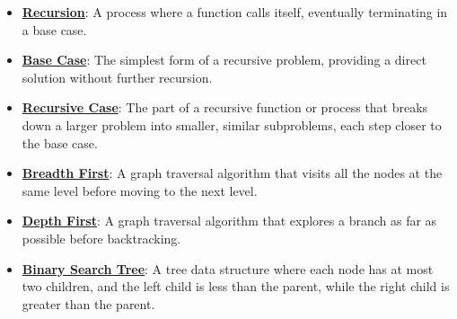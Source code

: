 \documentclass{article}%
\begin{document}
\begin{itemize}[leftmargin=*]%
\item \href{https://purdue.brightspace.com/d2l/common/assets/pdfjs-d2l-dist/1.0.14-legacy/web/viewer.html?file=%2Fcontent%2Fenforced%2F1095467-wl.202510.CS.24300.001%2F14L1-DepthFS.pdf%3Fou%3D1095467&lang=en-us&container=d2l-fileviewer-rendered-pdf&fullscreen=d2l-fileviewer-rendered-pdf-dialog&height=667#page=2}{\textbf{Recursion}}: A process where a function calls itself, eventually terminating in a base case.%
\item \href{https://purdue.brightspace.com/d2l/common/assets/pdfjs-d2l-dist/1.0.14-legacy/web/viewer.html?file=%2Fcontent%2Fenforced%2F1095467-wl.202510.CS.24300.001%2F14L1-DepthFS.pdf%3Fou%3D1095467&lang=en-us&container=d2l-fileviewer-rendered-pdf&fullscreen=d2l-fileviewer-rendered-pdf-dialog&height=667#page=5}{\textbf{Base Case}}: The simplest form of a recursive problem, providing a direct solution without further recursion.%
\item \href{https://purdue.brightspace.com/d2l/common/assets/pdfjs-d2l-dist/1.0.14-legacy/web/viewer.html?file=%2Fcontent%2Fenforced%2F1095467-wl.202510.CS.24300.001%2F14L1-DepthFS.pdf%3Fou%3D1095467&lang=en-us&container=d2l-fileviewer-rendered-pdf&fullscreen=d2l-fileviewer-rendered-pdf-dialog&height=667#page=5}{\textbf{Recursive Case}}: The part of a recursive function or process that breaks down a larger problem into smaller, similar subproblems, each step closer to the base case.%
\item \href{https://purdue.brightspace.com/d2l/common/assets/pdfjs-d2l-dist/1.0.14-legacy/web/viewer.html?file=%2Fcontent%2Fenforced%2F1095467-wl.202510.CS.24300.001%2F14L1-DepthFS.pdf%3Fou%3D1095467&lang=en-us&container=d2l-fileviewer-rendered-pdf&fullscreen=d2l-fileviewer-rendered-pdf-dialog&height=667#page=8}{\textbf{Breadth First}}: A graph traversal algorithm that visits all the nodes at the same level before moving to the next level.%
\item \href{https://purdue.brightspace.com/d2l/common/assets/pdfjs-d2l-dist/1.0.14-legacy/web/viewer.html?file=%2Fcontent%2Fenforced%2F1095467-wl.202510.CS.24300.001%2F14L1-DepthFS.pdf%3Fou%3D1095467&lang=en-us&container=d2l-fileviewer-rendered-pdf&fullscreen=d2l-fileviewer-rendered-pdf-dialog&height=667#page=8}{\textbf{Depth First}}: A graph traversal algorithm that explores a branch as far as possible before backtracking.%
\item \href{https://purdue.brightspace.com/d2l/common/assets/pdfjs-d2l-dist/1.0.14-legacy/web/viewer.html?file=%2Fcontent%2Fenforced%2F1095467-wl.202510.CS.24300.001%2F14L1-DepthFS.pdf%3Fou%3D1095467&lang=en-us&container=d2l-fileviewer-rendered-pdf&fullscreen=d2l-fileviewer-rendered-pdf-dialog&height=667#page=9}{\textbf{Binary Search Tree}}: A tree data structure where each node has at most two children, and the left child is less than the parent, while the right child is greater than the parent.%

\end{itemize}
\end{document}
